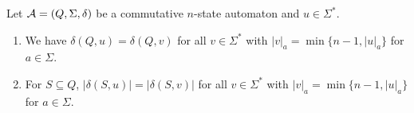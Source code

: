 \begin{proposition} \label{prelim:classes:comm:lem:words-SIS-SFS}
	Let $\mathcal A = (Q, \Sigma, \delta)$
	be a commutative $n$-state automaton and $u \in \Sigma^*$.
	\begin{enumerate}
		\item \label{prelim:classes:comm:lem:words-SIS-SFS:1} We have $\delta(Q, u) = \delta(Q, v)$
		for all $v \in \Sigma^*$
		with $|v|_a = \min\{ n - 1, |u|_a \}$
		for $a \in \Sigma$.
		
		\item \label{prelim:classes:comm:lem:words-SIS-SFS:2} For $S \subseteq Q$, $|\delta(S, u)| = |\delta(S, v)|$ for all $v \in \Sigma^*$
		with $|v|_a = \min\{ n - 1, |u|_a \}$ for $a \in \Sigma$.
	\end{enumerate}
\end{proposition}
